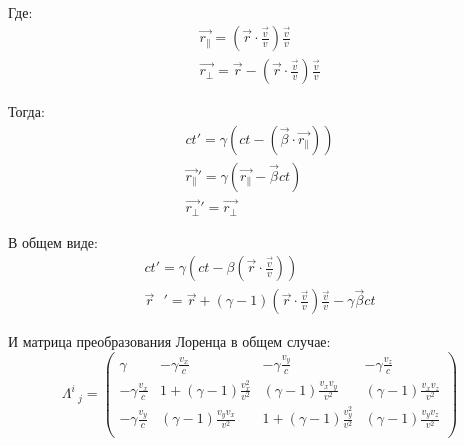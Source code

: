 \documentclass[12pt]{article}
\begin{document}
\begin{large}
\begin{equation}
\begin{gathered}
    \end{gathered}
    \end{equation}
    \par Где:
    \begin{equation}
    \begin{gathered}
        \vec{r_{\parallel}} = \left(\vec{r} \cdot \frac{\vec{v}}{v}\right) \frac{\vec{v}}{v} \\
        \vec{r_\perp} = \vec{r} - \left(\vec{r} \cdot \frac{\vec{v}}{v}\right) \frac{\vec{v}}{v}
    \end{gathered}
    \end{equation}
    \par Тогда:
    \begin{equation}
    \begin{gathered}
        ct' = \gamma \left( ct - \left(\vec{\beta} \cdot \vec{r_{\parallel}}\right)   \right) \\
        \vec{r_{\parallel}}' = \gamma \left(\vec{r_\parallel} - \vec{\beta}ct \right) \\
        \vec{r_\perp}' = \vec{r_\perp}
    \end{gathered}
    \end{equation}
    \par В общем виде:
    \begin{equation}
    \begin{gathered}
        ct' = \gamma \left( ct - \beta \left(\vec{r} \cdot \frac{\vec{v}}{v}\right)  \right) \\
        \vec{r}\text{ }' = \vec{r} + \left( \gamma - 1 \right)\left(\vec{r} \cdot \frac{\vec{v}}{v}\right) \frac{\vec{v}}{v} - \gamma\vec{\beta}ct
    \end{gathered}
    \end{equation}
    \par И матрица преобразования Лоренца в общем случае:
    \begin{equation}
        \Lambda^i_{\text{ }j} =
        \begin{pmatrix}
            \gamma & -\gamma\frac{v_x}{c} & -\gamma\frac{v_y}{c} & -\gamma\frac{v_z}{c}\\
            -\gamma\frac{v_x}{c} & 1 + \left( \gamma - 1 \right)\frac{v_x^2}{v^2} & \left( \gamma - 1 \right)\frac{v_x v_y}{v^2} & \left( \gamma - 1 \right)\frac{v_x v_z}{v^2} \\
            -\gamma\frac{v_y}{c} & \left( \gamma - 1 \right)\frac{v_y v_x}{v^2} & 1 + \left( \gamma - 1 \right)\frac{v_y^2}{v^2} & \left( \gamma - 1 \right)\frac{v_y v_z}{v^2} \\

\end{pmatrix}
\end{equation}
\end{large}
\end{document}
